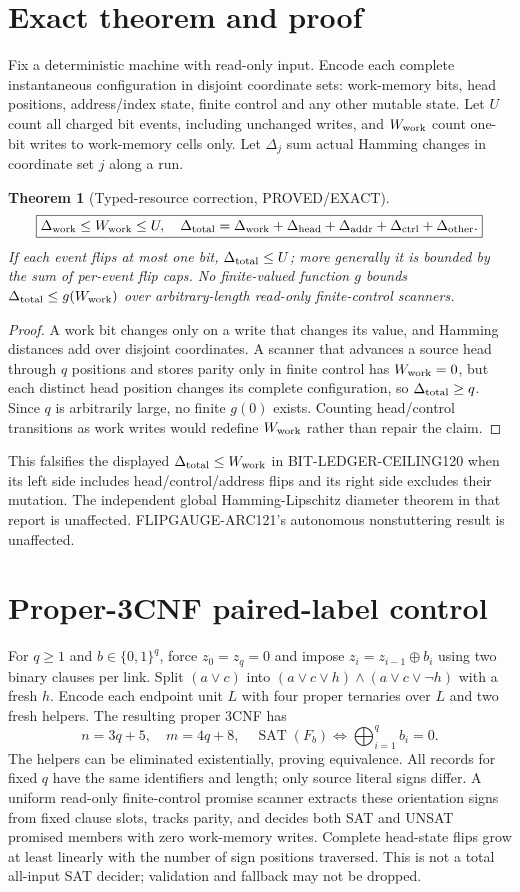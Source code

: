 \documentclass[11pt]{article}
\newtheorem{theorem}{Theorem}
\begin{document}
\section{Exact theorem and proof}
Fix a deterministic machine with read-only input. Encode each complete instantaneous configuration in disjoint coordinate sets: work-memory bits, head positions, address/index state, finite control and any other mutable state. Let $U$ count all charged bit events, including unchanged writes, and $W_{\rm work}$ count one-bit writes to work-memory cells only. Let $\Delta_j$ sum actual Hamming changes in coordinate set $j$ along a run.
\begin{theorem}[Typed-resource correction, PROVED/EXACT]
\[
\boxed{\Delta_{\rm work}\le W_{\rm work}\le U,\quad
\Delta_{\rm total}=\Delta_{\rm work}+\Delta_{\rm head}
+\Delta_{\rm addr}+\Delta_{\rm ctrl}+\Delta_{\rm other}.}
\]
If each event flips at most one bit, $\Delta_{\rm total}\le U$; more generally it is bounded by the sum of per-event flip caps. No finite-valued function $g$ bounds $\Delta_{\rm total}\le g(W_{\rm work})$ over arbitrary-length read-only finite-control scanners.
\end{theorem}
\begin{proof}
A work bit changes only on a write that changes its value, and Hamming distances add over disjoint coordinates. A scanner that advances a source head through $q$ positions and stores parity only in finite control has $W_{\rm work}=0$, but each distinct head position changes its complete configuration, so $\Delta_{\rm total}\ge q$. Since $q$ is arbitrarily large, no finite $g(0)$ exists. Counting head/control transitions as work writes would redefine $W_{\rm work}$ rather than repair the claim.
\end{proof}
This falsifies the displayed $\Delta_{\rm total}\le W_{\rm work}$ in BIT-LEDGER-CEILING120 when its left side includes head/control/address flips and its right side excludes their mutation. The independent global Hamming-Lipschitz diameter theorem in that report is unaffected. FLIPGAUGE-ARC121's autonomous nonstuttering result is unaffected.
\section{Proper-3CNF paired-label control}
For $q\ge1$ and $b\in\{0,1\}^q$, force $z_0=z_q=0$ and impose $z_i=z_{i-1}\oplus b_i$ using two binary clauses per link. Split $(a\vee c)$ into $(a\vee c\vee h)\wedge(a\vee c\vee\neg h)$ with a fresh $h$. Encode each endpoint unit $L$ with four proper ternaries over $L$ and two fresh helpers. The resulting proper 3CNF has
\[
n=3q+5,\quad m=4q+8,\quad
\operatorname{SAT}(F_b)\iff\bigoplus_{i=1}^q b_i=0.
\]
The helpers can be eliminated existentially, proving equivalence. All records for fixed $q$ have the same identifiers and length; only source literal signs differ.
A uniform read-only finite-control promise scanner extracts these orientation signs from fixed clause slots, tracks parity, and decides both SAT and UNSAT promised members with zero work-memory writes. Complete head-state flips grow at least linearly with the number of sign positions traversed. This is not a total all-input SAT decider; validation and fallback may not be dropped.
\end{document}
